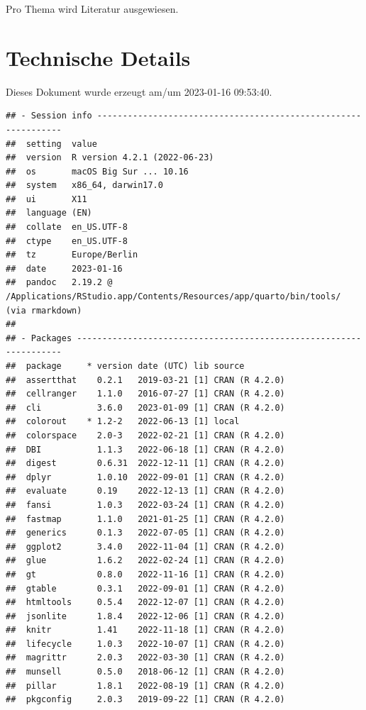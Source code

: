 \documentclass[
  a4paper,
  DIV=11]{scrreprt}
\theoremstyle{definition}
\theoremstyle{remark}
\begin{document}

Pro Thema wird Literatur ausgewiesen.

\hypertarget{technische-details}{%
\section*{Technische Details}\label{technische-details}}


Dieses Dokument wurde erzeugt am/um 2023-01-16 09:53:40.

\begin{verbatim}
## - Session info ---------------------------------------------------------------
##  setting  value
##  version  R version 4.2.1 (2022-06-23)
##  os       macOS Big Sur ... 10.16
##  system   x86_64, darwin17.0
##  ui       X11
##  language (EN)
##  collate  en_US.UTF-8
##  ctype    en_US.UTF-8
##  tz       Europe/Berlin
##  date     2023-01-16
##  pandoc   2.19.2 @ /Applications/RStudio.app/Contents/Resources/app/quarto/bin/tools/ (via rmarkdown)
## 
## - Packages -------------------------------------------------------------------
##  package     * version date (UTC) lib source
##  assertthat    0.2.1   2019-03-21 [1] CRAN (R 4.2.0)
##  cellranger    1.1.0   2016-07-27 [1] CRAN (R 4.2.0)
##  cli           3.6.0   2023-01-09 [1] CRAN (R 4.2.0)
##  colorout    * 1.2-2   2022-06-13 [1] local
##  colorspace    2.0-3   2022-02-21 [1] CRAN (R 4.2.0)
##  DBI           1.1.3   2022-06-18 [1] CRAN (R 4.2.0)
##  digest        0.6.31  2022-12-11 [1] CRAN (R 4.2.0)
##  dplyr         1.0.10  2022-09-01 [1] CRAN (R 4.2.0)
##  evaluate      0.19    2022-12-13 [1] CRAN (R 4.2.0)
##  fansi         1.0.3   2022-03-24 [1] CRAN (R 4.2.0)
##  fastmap       1.1.0   2021-01-25 [1] CRAN (R 4.2.0)
##  generics      0.1.3   2022-07-05 [1] CRAN (R 4.2.0)
##  ggplot2       3.4.0   2022-11-04 [1] CRAN (R 4.2.0)
##  glue          1.6.2   2022-02-24 [1] CRAN (R 4.2.0)
##  gt            0.8.0   2022-11-16 [1] CRAN (R 4.2.0)
##  gtable        0.3.1   2022-09-01 [1] CRAN (R 4.2.0)
##  htmltools     0.5.4   2022-12-07 [1] CRAN (R 4.2.0)
##  jsonlite      1.8.4   2022-12-06 [1] CRAN (R 4.2.0)
##  knitr         1.41    2022-11-18 [1] CRAN (R 4.2.0)
##  lifecycle     1.0.3   2022-10-07 [1] CRAN (R 4.2.0)
##  magrittr      2.0.3   2022-03-30 [1] CRAN (R 4.2.0)
##  munsell       0.5.0   2018-06-12 [1] CRAN (R 4.2.0)
##  pillar        1.8.1   2022-08-19 [1] CRAN (R 4.2.0)
##  pkgconfig     2.0.3   2019-09-22 [1] CRAN (R 4.2.0)

\end{verbatim}
\end{document}
